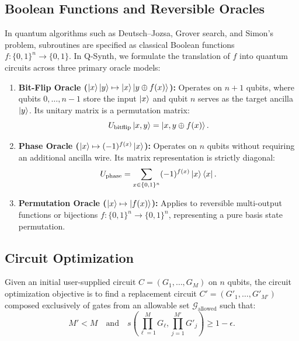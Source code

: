 \documentclass[11pt]{article}
\begin{document}
\subsection{Boolean Functions and Reversible Oracles}
In quantum algorithms such as Deutsch--Jozsa, Grover search, and Simon's problem, subroutines are specified as classical Boolean functions $f: \{0,1\}^n \to \{0,1\}$. In Q-Synth, we formulate the translation of $f$ into quantum circuits across three primary oracle models:
\begin{enumerate}[leftmargin=*]
    \item \textbf{Bit-Flip Oracle ($\ket{x}\ket{y} \mapsto \ket{x}\ket{y \oplus f(x)}$):} Operates on $n+1$ qubits, where qubits $0, \dots, n-1$ store the input $\ket{x}$ and qubit $n$ serves as the target ancilla $\ket{y}$. Its unitary matrix is a permutation matrix:
    \begin{equation}
        U_{\text{bitflip}} \ket{x, y} = \ket{x, y \oplus f(x)}.
        \label{eq:bitflip}
    \end{equation}
    \item \textbf{Phase Oracle ($\ket{x} \mapsto (-1)^{f(x)}\ket{x}$):} Operates on $n$ qubits without requiring an additional ancilla wire. Its matrix representation is strictly diagonal:
    \begin{equation}
        U_{\text{phase}} = \sum_{x \in \{0,1\}^n} (-1)^{f(x)} \ket{x}\bra{x}.
        \label{eq:phase}
    \end{equation}
    \item \textbf{Permutation Oracle ($\ket{x} \mapsto \ket{f(x)}$):} Applies to reversible multi-output functions or bijections $f: \{0,1\}^n \to \{0,1\}^n$, representing a pure basis state permutation.
\end{enumerate}

\subsection{Circuit Optimization}
Given an initial user-supplied circuit $C = (G_1, \dots, G_M)$ on $n$ qubits, the circuit optimization objective is to find a replacement circuit $C' = (G'_1, \dots, G'_{M'})$ composed exclusively of gates from an allowable set $\mathcal{G}_{\text{allowed}}$ such that:
\begin{equation}
    M' < M \quad \text{and} \quad s\left(\prod_{\ell=1}^M G_\ell, \prod_{j=1}^{M'} G'_j\right) \ge 1 - \epsilon.
    \label{eq:opt_obj}
\end{equation}
\end{document}
